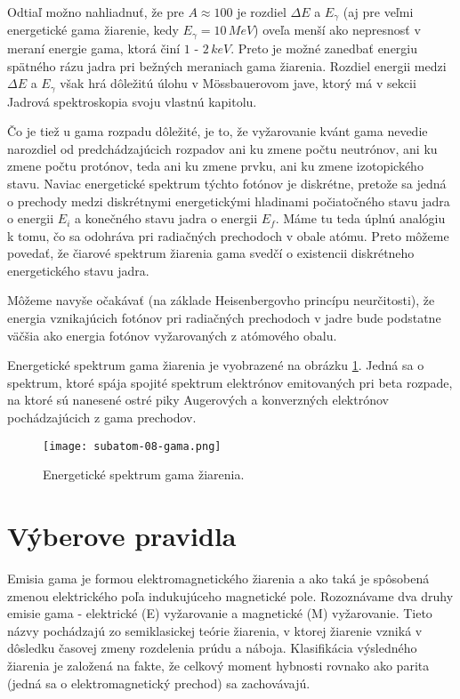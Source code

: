 \documentclass[../../main.tex]{subfiles}
\begin{document}
Odtiaľ možno nahliadnuť, že pre $A \approx 100$ je rozdiel $\Delta E$ a $E_{\gamma}$ (aj pre veľmi energetické gama žiarenie, kedy $E_{\gamma} = 10\,\unit{MeV}$) oveľa menší ako nepresnosť v meraní energie gama, ktorá činí $1$ - $2\,\unit{keV}$. Preto je možné zanedbať energiu spätného rázu jadra pri bežných meraniach gama žiarenia. Rozdiel energii medzi $\Delta E$ a $E_{\gamma}$ však hrá dôležitú úlohu v Mössbauerovom jave, ktorý má v sekcii Jadrová spektroskopia svoju vlastnú kapitolu.

Čo je tiež u gama rozpadu dôležité, je to, že vyžarovanie kvánt gama nevedie narozdiel od predchádzajúcich rozpadov ani ku zmene počtu neutrónov, ani ku zmene počtu protónov, teda ani ku zmene prvku, ani ku zmene izotopického stavu. Naviac energetické spektrum týchto fotónov je diskrétne, pretože sa jedná o prechody medzi diskrétnymi energetickými hladinami počiatočného stavu jadra o energii $E_i$ a konečného stavu jadra o energii $E_f$. Máme tu teda úplnú analógiu k tomu, čo sa odohráva pri radiačných prechodoch v obale atómu. Preto môžeme povedať, že čiarové spektrum žiarenia gama svedčí o existencii diskrétneho energetického stavu jadra.

Môžeme navyše očakávať (na základe Heisenbergovho princípu neurčitosti), že energia vznikajúcich fotónov pri radiačných prechodoch v jadre bude podstatne väčšia ako energia fotónov vyžarovaných z atómového obalu.

Energetické spektrum gama žiarenia je vyobrazené na obrázku \ref{sf8:fig:gama}. Jedná sa o spektrum, ktoré spája spojité spektrum elektrónov emitovaných pri beta rozpade, na ktoré sú nanesené ostré piky Augerových a konverzných elektrónov pochádzajúcich z gama prechodov.

\begin{figure}[!h]
\texttt{[image: subatom-08-gama.png]}
\centering
\caption{Energetické spektrum gama žiarenia.}
\label{sf8:fig:gama}
\end{figure}

\section{Výberove pravidla}
Emisia gama je formou elektromagnetického žiarenia a ako taká je spôsobená zmenou elektrického poľa indukujúceho magnetické pole. Rozoznávame dva druhy emisie gama - elektrické (E) vyžarovanie a magnetické (M) vyžarovanie. Tieto názvy pochádzajú zo semiklasickej teórie žiarenia, v ktorej žiarenie vzniká v dôsledku časovej zmeny rozdelenia prúdu a náboja. Klasifikácia výsledného žiarenia je založená na fakte, že celkový moment hybnosti rovnako ako parita (jedná sa o elektromagnetický prechod) sa zachovávajú.
\end{document}
